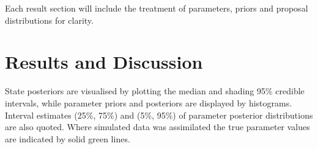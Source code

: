 \documentclass{ruthesis}
\begin{document}
Each result section will include the treatment of parameters, priors and proposal distributions for clarity.  



\FloatBarrier
\section{Results and Discussion}

State posteriors are visualised by plotting the median and shading 95\% credible intervals, while parameter priors and posteriors are displayed by histograms. Interval estimates (25\%, 75\%) and (5\%, 95\%) of parameter posterior distributions are also quoted. 
Where simulated data was assimilated the true parameter values are indicated by solid green lines.


%
%
%
\end{document}
